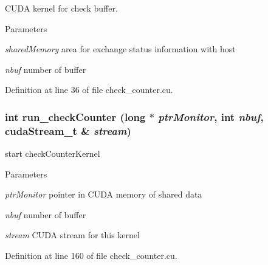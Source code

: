 CUDA kernel for check buffer. 
\begin{DoxyParams}{Parameters}
\item[{\em sharedMemory}]area for exchange status information with host \item[{\em nbuf}]number of buffer \end{DoxyParams}


Definition at line 36 of file check\_\-counter.cu.\hypertarget{check__counter_8cu_ac9565e5590f3a246a043817906fc9965}{
\subsubsection[{run\_\-checkCounter}]{\setlength{\rightskip}{0pt plus 5cm}int run\_\-checkCounter (long $\ast$ {\em ptrMonitor}, \/  int {\em nbuf}, \/  cudaStream\_\-t \& {\em stream})}}
\label{check__counter_8cu_ac9565e5590f3a246a043817906fc9965}


start checkCounterKernel 
\begin{DoxyParams}{Parameters}
\item[{\em ptrMonitor}]pointer in CUDA memory of shared data \item[{\em nbuf}]number of buffer \item[{\em stream}]CUDA stream for this kernel \end{DoxyParams}


Definition at line 160 of file check\_\-counter.cu.